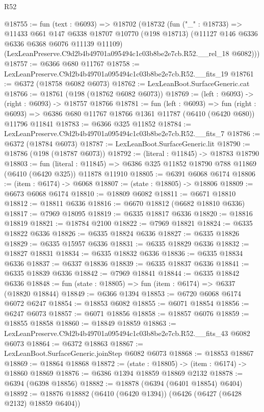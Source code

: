 \begin{lexlean}{R52}
\begin{coremodule}
@18755 := fun (text : @6093) =>
  @18702
    (@18732
      (fun ("_" : @18733) =>
      @11433
        @661
        @147
        @6338
        @18707
        @10770
        (@198 @18713)
        (@11127 @146 @6336 @6336 @6368 @6076 @11139 @11109)
        (LexLeanPreserve.C9d2b4b49701a095494c1c03b8be2e7cb.R52.__rel_18 @6082)))
@18757 := @6366 @680 @11767
@18758 := LexLeanPreserve.C9d2b4b49701a095494c1c03b8be2e7cb.R52.__fits_19
@18761 := @6372 (@18758 @6082 @6073)
@18762 := LexLeanBoot.SurfaceGeneric.cat
@18766 := @18761 (@198 (@18762 @6082 @6073))
@18769 := (left : @6093) -> (right : @6093) -> @18757 @18766
@18781 := fun (left : @6093) =>
  fun (right : @6093) => @6386 @680 @11767 @18766 @1361 @11787 (@6410 (@6420 @680)) @11796 @11841
@18783 := @6366 @325 @11852
@18784 := LexLeanPreserve.C9d2b4b49701a095494c1c03b8be2e7cb.R52.__fits_7
@18786 := @6372 (@18784 @6073)
@18787 := LexLeanBoot.SurfaceGeneric.lit
@18790 := @18786 (@198 (@18787 @6073))
@18792 := (literal : @11845) -> @18783 @18790
@18803 := fun (literal : @11845) =>
  @6386 @325 @11852 @18790 @788 @11869 (@6410 (@6420 @325)) @11878 @11910
@18805 := @6391 @6068 @6174
@18806 := (item : @6174) -> @6068
@18807 := (state : @18805) -> @18806
@18809 := @6673 @6068 @6174
@18810 := @18809 @6082
@18811 := @6671 @18810
@18812 := @18811 @6336
@18816 := @6670 @18812 (@6682 @18810 @6336)
@18817 := @7969 @18095
@18819 := @6335 @18817 @6336
@18820 := @18816 @18819
@18821 := @18784 @2100
@18822 := @7969 @18821
@18824 := @6335 @18822 @6336
@18826 := @6335 @18824 @6336
@18827 := @6335 @18826
@18829 := @6335 @15957 @6336
@18831 := @6335 @18829 @6336
@18832 := @18827 @18831
@18834 := @6335 @18832 @6336
@18836 := @6335 @18834 @6336
@18837 := @6337 @18836
@18839 := @6335 @18837 @6336
@18841 := @6335 @18839 @6336
@18842 := @7969 @18841
@18844 := @6335 @18842 @6336
@18848 := fun (state : @18805) => fun (item : @6174) => @6337 (@18820 @18844)
@18849 := @6366 @1394
@18853 := @6720 @6068 @6174 @6072 @6247
@18854 := @18853 @6082
@18855 := @6071 @18854
@18856 := @6247 @6073
@18857 := @6071 @18856
@18858 := @18857 @6076
@18859 := @18855 @18858
@18860 := @18849 @18859
@18863 := LexLeanPreserve.C9d2b4b49701a095494c1c03b8be2e7cb.R52.__fits_43 @6082 @6073
@18864 := @6372 @18863
@18867 := LexLeanBoot.SurfaceGeneric.joinStep @6082 @6073
@18868 := @18853 @18867
@18869 := @18864 @18868
@18872 := (state : @18805) -> (item : @6174) -> @18860 @18869
@18876 := @6386 @1394 @18859 @18869 @2132
@18878 := @6394 (@6398 @18856)
@18882 := @18878 (@6394 (@6401 @18854) @6404)
@18892 := @18876 @18882 (@6410 (@6420 @1394)) (@6426 (@6427 (@6428 @2132) @18859 @6404))

\end{coremodule}
\end{lexlean}
